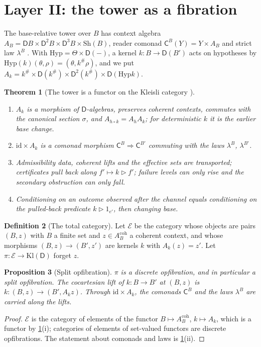 \documentclass[11pt]{article}
\newtheorem{theorem}{Theorem}[section]
\newtheorem{proposition}[theorem]{Proposition}
\theoremstyle{definition}
\newtheorem{definition}[theorem]{Definition}
\theoremstyle{remark}
\newcommand{\D}{\mathsf{D}}
\newcommand{\Kl}{\mathrm{Kl}}
\newcommand{\Hyp}{\mathrm{Hyp}}
\newcommand{\Sh}{\mathrm{Sh}}
\newcommand{\C}{\mathsf{C}}
\newcommand{\id}{\mathrm{id}}
\begin{document}
\section{Layer II: the tower as a fibration}\label{sec:fibre}

The base-relative tower over $B$ has context algebra $A_B=\D B\times\D^2B\times\D^3B\times\Sh(B)$,
reader comonad $\C^B(Y)=Y\times A_B$ and strict law $\lambda^B$ \cite[\S9]{Awasthi-Tower}. With
$\Hyp=\Theta\times\D(-)$, a kernel $k\colon B\to\D(B')$ acts on hypotheses by
$\Hyp(k)(\theta,\rho)=(\theta,k^\#\rho)$, and we put
$A_k=k^\#\times\D(k^\#)\times\D^2(k^\#)\times\D(\Hyp k)$.

\begin{theorem}[The tower is a functor on the Kleisli category {\cite[Prop.~9.14, Cor.~9.15, Prop.~9.16]{Awasthi-Tower}}]\label{thm:fibre}
\leavevmode
\begin{enumerate}[label=(\roman*)]
\item $A_k$ is a morphism of $\D$-algebras, preserves coherent contexts, commutes with the canonical
  section $\sigma$, and $A_{h\circ k}=A_hA_k$; for deterministic $k$ it is the earlier base change.
\item $\id\times A_k$ is a comonad morphism $\C^B\Rightarrow\C^{B'}$ commuting with the laws $\lambda^B$,
  $\lambda^{B'}$.
\item Admissibility data, coherent lifts and the effective sets are transported; certificates pull
  back along $f'\mapsto k\rhd f'$; failure levels can only rise and the secondary obstruction can only
  fall.
\item Conditioning on an outcome observed after the channel equals conditioning on the pulled-back
  predicate $k\rhd1_{e'}$, then changing base.
\end{enumerate}
\end{theorem}

\begin{definition}[The total category]\label{def:total}
Let $\mathcal E$ be the category whose objects are pairs $(B,z)$ with $B$ a finite set and $z\in A_B^{\mathrm{coh}}$ a
coherent context, and whose morphisms $(B,z)\to(B',z')$ are kernels $k$ with $A_k(z)=z'$. Let $\pi\colon\mathcal E\to\Kl(\D)$
forget $z$.
\end{definition}

\begin{proposition}[Split opfibration]\label{prop:opfib}
$\pi$ is a discrete opfibration, and in particular a split opfibration. The cocartesian lift of $k\colon B\to B'$ at
$(B,z)$ is $k\colon(B,z)\to(B',A_kz)$. Through $\id\times A_k$, the comonads $\C^B$ and the laws $\lambda^B$ are carried
along the lifts.
\end{proposition}
\begin{proof}
$\mathcal E$ is the category of elements of the functor $B\mapsto A^{\mathrm{coh}}_B$, $k\mapsto A_k$, which is a functor by
\cref{thm:fibre}(i); categories of elements of set-valued functors are discrete opfibrations. The statement about
comonads and laws is \cref{thm:fibre}(ii).
\end{proof}
\end{document}
